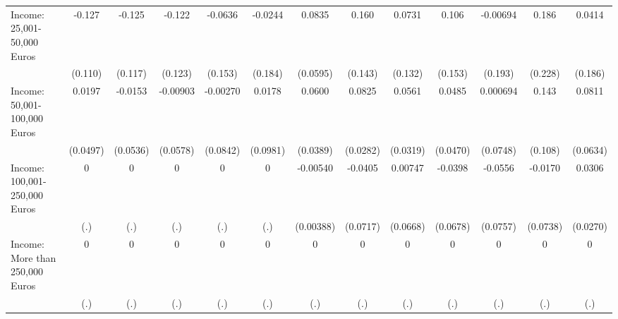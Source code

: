 {\begin{tabular}{l*{12}{c}}
\addlinespace
Income: 25,001-50,000 Euros&      -0.127         &      -0.125         &      -0.122         &     -0.0636         &     -0.0244         &      0.0835         &       0.160         &      0.0731         &       0.106         &    -0.00694         &       0.186         &      0.0414         \\
            &     (0.110)         &     (0.117)         &     (0.123)         &     (0.153)         &     (0.184)         &    (0.0595)         &     (0.143)         &     (0.132)         &     (0.153)         &     (0.193)         &     (0.228)         &     (0.186)         \\
\addlinespace
Income: 50,001-100,000 Euros&      0.0197         &     -0.0153         &    -0.00903         &    -0.00270         &      0.0178         &      0.0600         &      0.0825\sym{**} &      0.0561         &      0.0485         &    0.000694         &       0.143         &      0.0811         \\
            &    (0.0497)         &    (0.0536)         &    (0.0578)         &    (0.0842)         &    (0.0981)         &    (0.0389)         &    (0.0282)         &    (0.0319)         &    (0.0470)         &    (0.0748)         &     (0.108)         &    (0.0634)         \\
\addlinespace
Income: 100,001-250,000 Euros&           0         &           0         &           0         &           0         &           0         &    -0.00540         &     -0.0405         &     0.00747         &     -0.0398         &     -0.0556         &     -0.0170         &      0.0306         \\
            &         (.)         &         (.)         &         (.)         &         (.)         &         (.)         &   (0.00388)         &    (0.0717)         &    (0.0668)         &    (0.0678)         &    (0.0757)         &    (0.0738)         &    (0.0270)         \\
\addlinespace
Income: More than 250,000 Euros&           0         &           0         &           0         &           0         &           0         &           0         &           0         &           0         &           0         &           0         &           0         &           0         \\
            &         (.)         &         (.)         &         (.)         &         (.)         &         (.)         &         (.)         &         (.)         &         (.)         &         (.)         &         (.)         &         (.)         &         (.)         \\
\bottomrule
\end{tabular}
}
